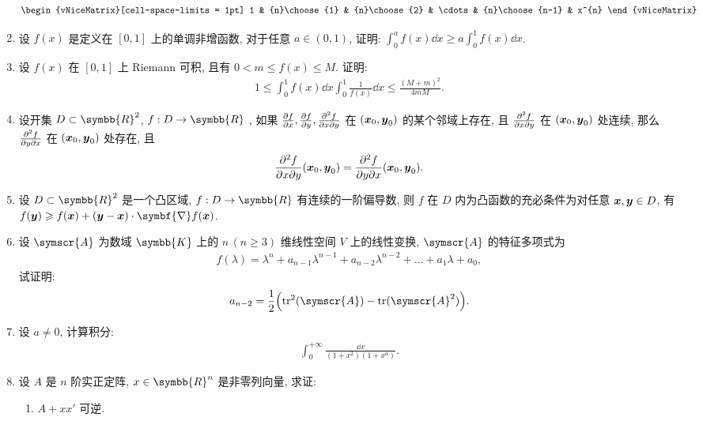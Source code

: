 \documentclass{ctexart}
\let\ge\geqslant
\let\le\leqslant
\def\grad{\symbf{\nabla}}
\newcommand{\R}{\ensuremath{\symbb{R}}}
\newcommand{\K}{\ensuremath{\symbb{K}}}
\begin{document}
\begin{enumerate}[series=exer]
\begin{align*}
\begin{vNiceMatrix}[cell-space-limits = 1pt]
            1 & {n}\choose{1} & {n}\choose{2} & \cdots & {n}\choose{n-1} & x^{n}
        \end{vNiceMatrix}
    \end{align*}
    \item 设 $ f(x) $ 是定义在 $ [0, 1] $ 上的单调非增函数, 对于任意 $ a \in (0, 1) $, 证明: $ \int_{0}^{a}f(x) \dd{x} \ge a\int_{0}^{1}f(x) \dd{x} $.
    \item 设 $ f(x) $ 在 $ [0, 1] $ 上 Riemann 可积, 且有 $ 0 < m \le f(x) \le M $. 证明:
    \begin{align*}
        1 \le \int_{0}^{1}f(x) \dd{x} \int_{0}^{1} \frac{1}{f(x)} \dd{x} \le \frac{(M+m)^{2}}{4mM}.
    \end{align*}
    \item 设开集 $ D\subset \R^{2} $, $ f: D \to \R $ , 如果 $ \pdv{f}{x}, \pdv{f}{y}, \pdv{f}{x}{y} $ 在 $ (\vb*{x}_{0}, \vb*{y}_{0}) $ 的某个邻域上存在, 且 $ \pdv{f}{x}{y} $ 在 $ (\vb*{x}_{0}, \vb*{y}_{0}) $ 处连续, 那么 $ \pdv{f}{y}{x} $ 在 $ (\vb*{x}_{0}, \vb*{y}_{0}) $ 处存在, 且
    \begin{align*}
        \pdv{f}{x}{y}{} (\vb*{x}_{0}, \vb*{y}_{0}) = \pdv{f}{y}{x}{} (\vb*{x}_{0}, \vb*{y}_{0}).
    \end{align*}
    \item 设 $ D \subset \R^{2} $ 是一个凸区域, $ f: D \to \R $ 有连续的一阶偏导数, 则 $ f $ 在 $ D $ 内为凸函数的充必条件为对任意 $ \vb*{x}, \vb*{y}\in D $, 有 $ f(\vb*{y}) \ge f(\vb*{x}) + (\vb*{y} - \vb*{x})\cdot\grad f(\vb*{x}) $. 
    \item 设 $ \symscr{A} $ 为数域 $ \K $ 上的 $ n\,(n \ge 3) $ 维线性空间 $ V $ 上的线性变换, $ \symscr{A} $ 的特征多项式为 
    \begin{align*}
        f(\lambda) = \lambda^{n} + a_{n-1}\lambda^{n-1} + a_{n-2}\lambda^{n-2} + \dots + a_{1}\lambda + a_{0},
    \end{align*}
    试证明:
    \begin{align*}
        a_{n - 2} = \frac{1}{2}\qty(\tr^{2}(\symscr{A}) - \tr(\symscr{A}^{2})).
    \end{align*}
    \item 设 $ a\ne 0 $, 计算积分: 
    \begin{align*}
        \int_{0}^{+\infty}\frac{\dd{x}}{(1+x^{2})(1+x^{a})}.
    \end{align*}
    \item 设 $ A $ 是 $ n $ 阶实正定阵, $ x \in \R^{n} $ 是非零列向量, 求证:
    \begin{enumerate}
        \item $ A + xx' $ 可逆.

\end{enumerate}
\end{enumerate}
\end{document}
